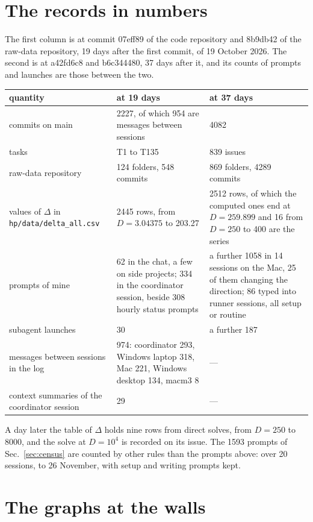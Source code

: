 \documentclass[aps,prd,onecolumn,superscriptaddress,nofootinbib,10pt]{revtex4-2}
\newcommand{\file}[1]{\texttt{#1}}
\begin{document}
\section{The records in numbers}
\label{app:numbers}

The first column is at commit 07eff89 of the code repository and 8b9db42 of the raw-data repository, 19 days after the
first commit, of 19 October 2026. The second is at a42fd6c8 and b6c344480, 37 days after it, and its counts of prompts
and launches are those between the two.

\begin{center}
\small
\begin{tabular}{L{4.0cm}L{5.7cm}L{5.9cm}}
\toprule
quantity & at 19 days & at 37 days\\
\midrule
commits on main & 2227, of which 954 are messages between sessions & 4082\\
tasks & T1 to T135 & 839 issues\\
raw-data repository & 124 folders, 548 commits & 869 folders, 4289 commits\\
values of $\Delta$ in \file{hp/data/delta\_all.csv} & 2445 rows, from $D = 3.04375$ to 203.27 & 2512 rows, of which the computed ones end at $D = 259.899$ and 16 from $D = 250$ to 400 are the series\\
prompts of mine & 62 in the chat, a few on side projects; 334 in the coordinator session, beside 308 hourly status prompts & a further 1058 in 14 sessions on the Mac, 25 of them changing the direction; 86 typed into runner sessions, all setup or routine\\
subagent launches & 30 & a further 187\\
messages between sessions in the log & 974: coordinator 293, Windows laptop 318, Mac 221, Windows desktop 134, macm3 8 & ---\\
context summaries of the coordinator session & 29 & ---\\
\bottomrule
\end{tabular}
\end{center}

A day later the table of $\Delta$ holds nine rows from direct solves, from $D = 250$ to 8000, and the solve at
$D = 10^4$ is recorded on its issue. The 1593 prompts of Sec.~\ref{sec:census} are counted by other rules than the
prompts above: over 20 sessions, to 26 November, with setup and writing prompts kept.


\section{The graphs at the walls}
\label{app:graphs}
\end{document}
